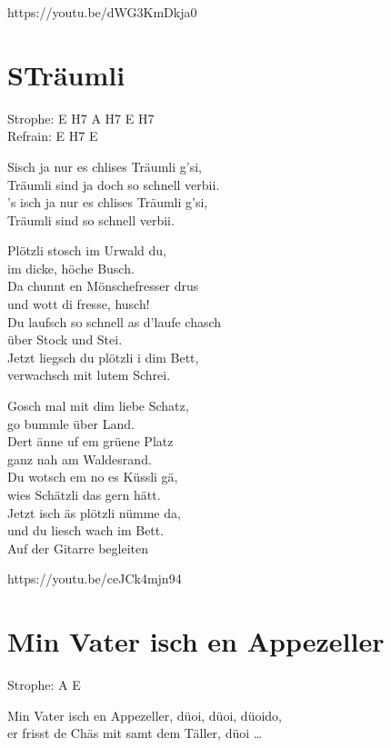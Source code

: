 \documentclass[
  letterpaper,
  twoside=false]{scrbook}
\begin{document}
https://youtu.be/dWG3KmDkja0

\hypertarget{struxe4umli}{%
\chapter{S\textquotesingle Träumli}\label{struxe4umli}}

Strophe: E H7 A H7 E H7\\
Refrain: E H7 E

S\textquotesingle isch ja nur es chlises Träumli g'si,\\
Träumli sind ja doch so schnell verbii.\\
's isch ja nur es chlises Träumli g'si,\\
Träumli sind so schnell verbii.

Plötzli stosch im Urwald du,\\
im dicke, höche Busch.\\
Da chunnt en Mönschefresser drus\\
und wott di fresse, husch!\\
Du laufsch so schnell as d'laufe chasch\\
über Stock und Stei.\\
Jetzt liegsch du plötzli i dim Bett,\\
verwachsch mit lutem Schrei.

Gosch mal mit dim liebe Schatz,\\
go bummle über Land.\\
Dert änne uf em grüene Platz\\
ganz nah am Waldesrand.\\
Du wotsch em no es Küssli gä,\\
wies Schätzli das gern hätt.\\
Jetzt isch äs plötzli nümme da,\\
und du liesch wach im Bett.\\
Auf der Gitarre begleiten

https://youtu.be/ceJCk4mjn94

\hypertarget{min-vater-isch-en-appezeller}{%
\chapter{Min Vater isch en
Appezeller}\label{min-vater-isch-en-appezeller}}

Strophe: A E

Min Vater isch en Appezeller, düoi, düoi, düoido,\\
er frisst de Chäs mit samt dem Täller, düoi \ldots{}
\end{document}
